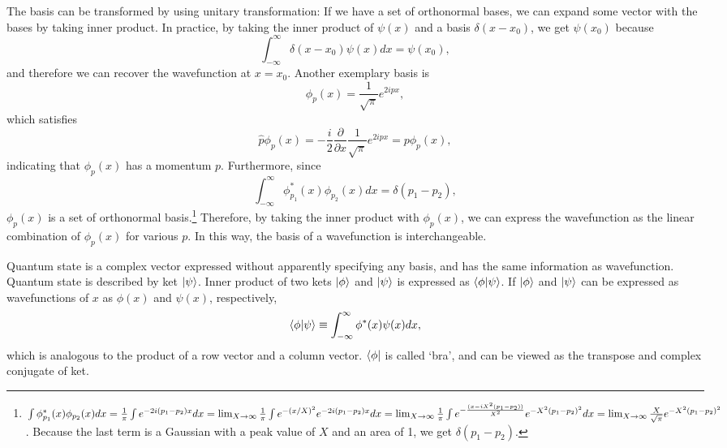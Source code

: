 \documentclass{book}
\begin{document}
The basis can be transformed by using unitary transformation: If we have a set of orthonormal bases, we can expand some vector with the bases by taking inner product.
In practice, by taking the inner product of $\psi(x)$ and a basis $\delta(x-x_0)$, we get $\psi(x_0)$ because
\begin{equation}
  \int_{-\infty}^{\infty}\delta(x-x_0)\psi(x)dx = \psi(x_0),
  \label{eq:delta_function_2}
\end{equation}
and therefore we can recover the wavefunction at $x = x_0$. Another exemplary basis is
\begin{equation}
  \phi_p(x) = \frac {1}{\sqrt{\pi}} e^{2ipx},
\end{equation}
which satisfies 
\begin{equation}
  \hat p \phi_p(x) = -\frac{i}{2}\frac{\partial}{\partial x} \frac{1}{\sqrt\pi}e^{2ipx} = p \phi_p(x),
\end{equation}
indicating that $\phi_p(x)$ has a momentum $p$. Furthermore, since
\begin{equation}
  \int_{-\infty}^{\infty}\phi_{p_1}^*(x)\phi_{p_2}(x)dx = \delta(p_1 - p_2),
\end{equation}
$\phi_p(x)$ is a set of orthonormal basis.\footnote{$\int\phi_{p_1}^*(x)\phi_{p_2}(x)dx = \frac 1 \pi \int e^{-2i(p_1-p_2)x}dx = \lim_{X\to\infty}\frac 1 \pi \int e^{-(x/X)^2}e^{-2i(p_1-p_2)x}dx\\= \lim_{X\to\infty}\frac 1 \pi \int e^{-\frac{(x-iX^2(p_1-p_2))}{X^2}}e^{-X^2(p_1-p_2)^2}dx = \lim_{X\to\infty}\frac X {\sqrt \pi}e^{-X^2(p_1-p_2)^2}$. Because the last term is a Gaussian with a peak value of $X$ and an area of 1, we get $\delta(p_1-p_2)$.}
Therefore, by taking the inner product with $\phi_p(x)$, we can express the wavefunction as the linear combination of $\phi_p(x)$ for various $p$. In this way, the basis of a wavefunction is interchangeable. 

Quantum state is a complex vector expressed without apparently specifying any basis, and has the same information as wavefunction. Quantum state is described by ket $\ket \psi$. Inner product of two kets $\ket \phi$ and $\ket \psi$ is expressed as $\braket{\phi|\psi}$. If $\ket \phi$ and $\ket \psi$ can be expressed as wavefunctions of $x$ as $\phi(x)$ and $\psi(x)$, respectively, 
\begin{equation}
  \braket{\phi|\psi} \equiv \int_{-\infty}^{\infty}\phi^*(x)\psi(x)dx,
\end{equation}
which is analogous to the product of a row vector and a column vector. $\bra \phi$ is called `bra', and can be viewed as the transpose and complex conjugate of ket.
\end{document}
